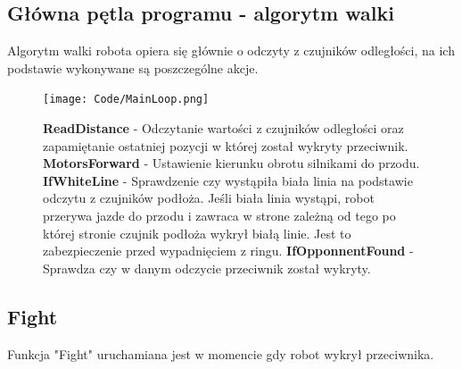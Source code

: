 \documentclass[polish,polish,a4paper]{article}
\begin{document}
    
    
    
    
   
    \subsection{Główna pętla programu - algorytm walki}
    Algorytm walki robota opiera się głównie o odczyty z czujników odległości, na ich podstawie wykonywane są poszczególne akcje.
    \newline

    
    \begin{figure}[!htb]
       \begin{minipage}{0.3\textwidth}
         
         
    
    
        \centering
        \texttt{[image: Code/MainLoop.png]}
        
       \end{minipage} \hspace{42mm}
       \begin{minipage}{0.47\textwidth}
         
    \textbf{ReadDistance} - Odczytanie wartości z czujników odległości oraz zapamiętanie ostatniej pozycji w której został wykryty przeciwnik.
    \newline
    \newline
    \textbf{MotorsForward} - Ustawienie kierunku obrotu silnikami do przodu.
    \newline
    \newline
    \textbf{IfWhiteLine} - Sprawdzenie czy wystąpiła biała linia na podstawie odczytu z czujników podłoża. Jeśli  biała linia wystąpi, robot przerywa jazde do przodu i zawraca w strone zależną od tego po której stronie czujnik podłoża wykrył białą linie. Jest to zabezpieczenie przed wypadnięciem z ringu.
    \newline
    \newline
    \textbf{IfOpponnentFound} - Sprawdza czy w danym odczycie przeciwnik został wykryty.
    


        \end{minipage}
        \end{figure}

    
  \newpage
    
    \subsection{Fight}
    Funkcja "Fight" uruchamiana jest w momencie gdy robot wykrył przeciwnika.
\end{document}
